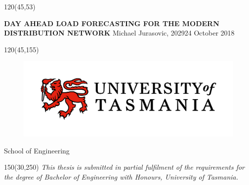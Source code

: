 \begin{textblock}{120}(45,53) %
\noindent\begin{minipage}[t][55mm][c]{\textwidth} 
\centering \Large  %
\vspace*{\fill}
{\bf DAY AHEAD LOAD FORECASTING FOR THE MODERN DISTRIBUTION NETWORK}
\vfill
Michael Jurasovic, 202924
\vfill
\large October 2018
\vspace*{\fill}
\end{minipage}
\end{textblock}

\begin{textblock}{120}(45,155)
\centering
\begin{figure}[h]
\centering\includegraphics[width=0.75\linewidth]{UTAS-Logo-colour-2018.jpg}
\end{figure}
\vspace{2cm}
\Large
School of Engineering


\end{textblock}


\begin{textblock}{150}(30,250)
\centering
\emph{This thesis is submitted in partial fulfilment of the requirements for the degree of
Bachelor of Engineering with Honours,
University of Tasmania.}
\end{textblock}



\null\cleardoublepage
{}
